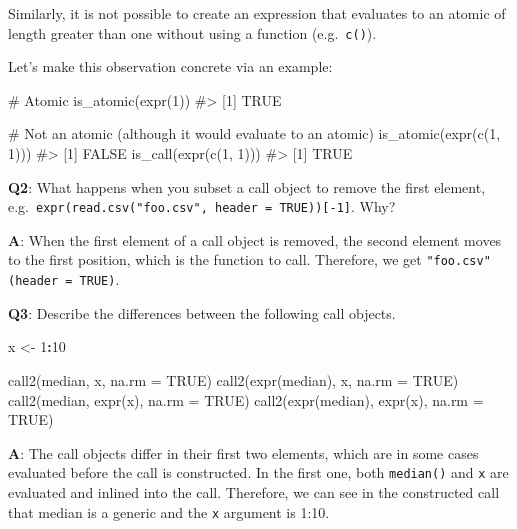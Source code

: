 \documentclass[
]{krantz}
\makeatletter
\newenvironment{Shaded}{\begin{snugshade}}{\end{snugshade}}
\newcommand{\CommentTok}[1]{\textcolor[rgb]{0.56,0.35,0.01}{\textit{#1}}}
\newcommand{\DataTypeTok}[1]{\textcolor[rgb]{0.13,0.29,0.53}{#1}}
\newcommand{\DecValTok}[1]{\textcolor[rgb]{0.00,0.00,0.81}{#1}}
\newcommand{\KeywordTok}[1]{\textcolor[rgb]{0.13,0.29,0.53}{\textbf{#1}}}
\newcommand{\NormalTok}[1]{#1}
\newcommand{\OperatorTok}[1]{\textcolor[rgb]{0.81,0.36,0.00}{\textbf{#1}}}
\newcommand{\OtherTok}[1]{\textcolor[rgb]{0.56,0.35,0.01}{#1}}
\newcommand{\StringTok}[1]{\textcolor[rgb]{0.31,0.60,0.02}{#1}}
\newenvironment{kframe}{%
\medskip{}
\setlength{\fboxsep}{.8em}
 \def\at@end@of@kframe{}%
 \ifinner\ifhmode%
  \def\at@end@of@kframe{\end{minipage}}%
  \begin{minipage}{\columnwidth}%
 \fi\fi%
 \def\FrameCommand##1{\hskip\@totalleftmargin \hskip-\fboxsep
 \colorbox{shadecolor}{##1}\hskip-\fboxsep
     \hskip-\linewidth \hskip-\@totalleftmargin \hskip\columnwidth}%
 \MakeFramed {\advance\hsize-\width
   \@totalleftmargin\z@ \linewidth\hsize
   \@setminipage}}%
 {\par\unskip\endMakeFramed%
 \at@end@of@kframe}
\renewenvironment{Shaded}{\begin{kframe}}{\end{kframe}}
\renewcommand{\KeywordTok} [1]{\textcolor[rgb]{0.00,0.44,0.13}{{#1}}}
\renewcommand{\DataTypeTok}[1]{\textcolor[rgb]{0.56,0.13,0.00}{{#1}}}
\renewcommand{\DecValTok}  [1]{\textcolor[rgb]{0.25,0.63,0.44}{{#1}}}
\renewcommand{\StringTok}  [1]{\textcolor[rgb]{0.25,0.44,0.63}{{#1}}}
\renewcommand{\CommentTok} [1]{\textcolor[rgb]{0.38,0.63,0.69}{{#1}}}
\renewcommand{\OtherTok}   [1]{\textcolor[rgb]{0.00,0.44,0.13}{{#1}}}
\renewcommand{\NormalTok}  [1]{{#1}}
\makeatother
\begin{document}
Similarly, it is not possible to create an expression that evaluates to an atomic of length greater than one without using a function (e.g.~\texttt{c()}).

Let's make this observation concrete via an example:

\begin{Shaded}
\begin{Highlighting}[]
\CommentTok{# Atomic}
\KeywordTok{is_atomic}\NormalTok{(}\KeywordTok{expr}\NormalTok{(}\DecValTok{1}\NormalTok{))}
\CommentTok{#> [1] TRUE}

\CommentTok{# Not an atomic (although it would evaluate to an atomic)}
\KeywordTok{is_atomic}\NormalTok{(}\KeywordTok{expr}\NormalTok{(}\KeywordTok{c}\NormalTok{(}\DecValTok{1}\NormalTok{, }\DecValTok{1}\NormalTok{)))}
\CommentTok{#> [1] FALSE}
\KeywordTok{is_call}\NormalTok{(}\KeywordTok{expr}\NormalTok{(}\KeywordTok{c}\NormalTok{(}\DecValTok{1}\NormalTok{, }\DecValTok{1}\NormalTok{)))}
\CommentTok{#> [1] TRUE}
\end{Highlighting}
\end{Shaded}

\textbf{{Q2}}: What happens when you subset a call object to remove the first element, e.g.~\texttt{expr(read.csv("foo.csv",\ header\ =\ TRUE)){[}-1{]}}. Why?

\textbf{{A}}: When the first element of a call object is removed, the second element moves to the first position, which is the function to call. Therefore, we get \texttt{"foo.csv"(header\ =\ TRUE)}.

\textbf{{Q3}}: Describe the differences between the following call objects.

\begin{Shaded}
\begin{Highlighting}[]
\NormalTok{x <-}\StringTok{ }\DecValTok{1}\OperatorTok{:}\DecValTok{10}

\KeywordTok{call2}\NormalTok{(median, x, }\DataTypeTok{na.rm =} \OtherTok{TRUE}\NormalTok{)}
\KeywordTok{call2}\NormalTok{(}\KeywordTok{expr}\NormalTok{(median), x, }\DataTypeTok{na.rm =} \OtherTok{TRUE}\NormalTok{)}
\KeywordTok{call2}\NormalTok{(median, }\KeywordTok{expr}\NormalTok{(x), }\DataTypeTok{na.rm =} \OtherTok{TRUE}\NormalTok{)}
\KeywordTok{call2}\NormalTok{(}\KeywordTok{expr}\NormalTok{(median), }\KeywordTok{expr}\NormalTok{(x), }\DataTypeTok{na.rm =} \OtherTok{TRUE}\NormalTok{)}
\end{Highlighting}
\end{Shaded}

\textbf{{A}}: The call objects differ in their first two elements, which are in some cases evaluated before the call is constructed. In the first one, both \texttt{median()} and \texttt{x} are evaluated and inlined into the call. Therefore, we can see in the constructed call that median is a generic and the \texttt{x} argument is 1:10.
\end{document}
